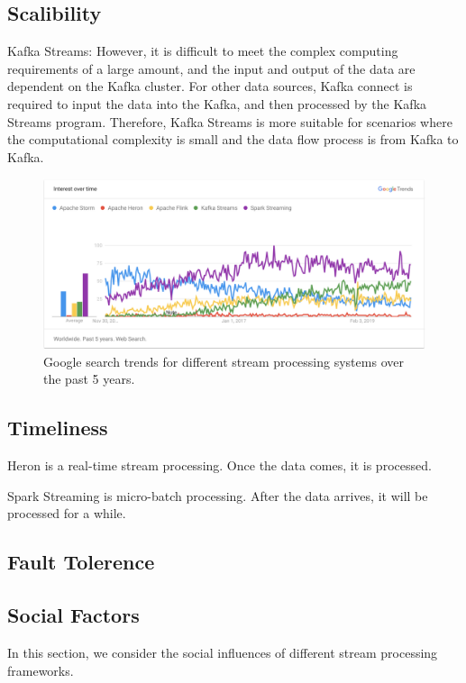 \documentclass[pdftex,twocolumn,10pt,letterpaper]{article}
\begin{document}
\subsection{Scalibility}


Kafka Streams: 
However, it is difficult to meet the complex computing requirements of a large amount, and the input and output of the data are dependent on the Kafka cluster. For other data sources, Kafka connect is required to input the data into the Kafka, and then processed by the Kafka Streams program. Therefore, Kafka Streams is more suitable for scenarios where the computational complexity is small and the data flow process is from Kafka to Kafka.

\begin{figure}[!ht]
    \centering
    \includegraphics[width=\textwidth]{trend.png}
    \caption{Google search trends\cite{googletrend} for different stream processing systems over the past 5 years.}
    \label{fig:trend}
\end{figure}

\subsection{Timeliness}

Heron is a real-time stream processing. Once the data comes, it is processed. 

Spark Streaming is micro-batch processing. After the data arrives, it will be processed for a while.

\subsection{Fault Tolerence}



\subsection{Social Factors}
In this section, we consider the social influences of different stream processing frameworks. 
\end{document}
